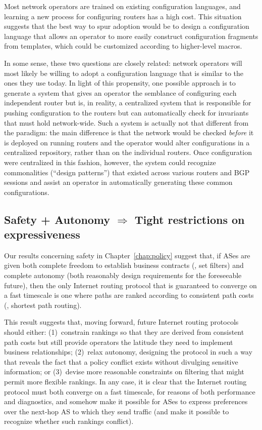 Most network operators are trained on existing configuration languages,
and learning a new process for configuring routers has a high cost.
This situation suggests that the best way to spur adoption would be to
design a configuration language that allows an operator to more easily
construct configuration fragments from templates, which could be
customized according to higher-level macros.

In some sense, these two questions are closely related: network
operators will most likely be willing to adopt a configuration language
that is similar to the ones they use today.  In light of this
propensity, one possible approach is to generate a system that gives an
operator the semblance of configuring each independent router but is, in
reality, a centralized system that is responsible for pushing
configuration to the routers but can automatically check for invariants
that must hold network-wide.  Such a system is actually not that
different from the \rcc paradigm: the main difference is that the
network would be checked {\em before} it is deployed on running routers
and the operator would alter configurations in a centralized repository,
rather than on the individual routers.  Once configuration were
centralized in this fashion, however, the system could recognize
commonalities (``design patterns'') that existed across various routers
and BGP sessions and assist an operator in automatically generating
these common configurations. 



\subsection{Safety + Autonomy $\Rightarrow$ Tight restrictions on
expressiveness}

Our results concerning safety in Chapter~\ref{chap:policy} suggest that,
if ASes are given both complete freedom to establish business contracts
(\ie, set filters) and complete autonomy (both reasonably design
requirements for the foreseeable future), then the only Internet routing
protocol that is guaranteed to converge on a fast timescale is one where
paths are ranked according to consistent path costs (\eg, shortest path
routing).  

This result suggests that, moving forward, future Internet routing
protocols should either: (1)~constrain rankings so that they are derived
from consistent path costs but still provide operators the
latitude they need to implement business relationships; (2)~relax
autonomy, designing the protocol in such a way that reveals the fact
that a policy conflict exists without divulging sensitive information;
or (3)~devise more reasonable constraints on filtering that might
permit more flexible rankings.
%
In any case, it is clear that the Internet routing protocol must
both converge on a fast timescale, for reasons of both performance and
diagnostics, and somehow make it possible for ASes to express
preferences over the next-hop AS to which they send traffic (and make it
possible to recognize whether such rankings conflict).
%

